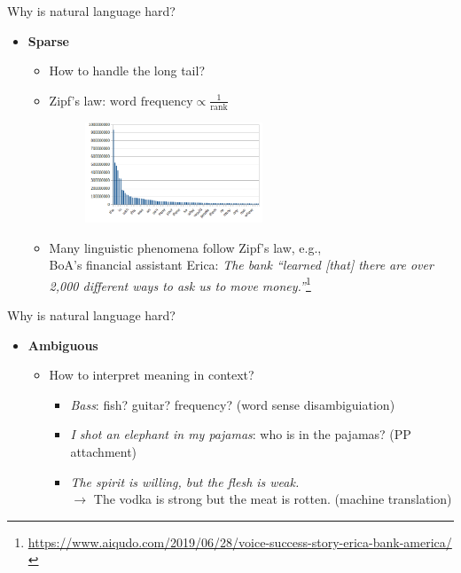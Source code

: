 \documentclass[usenames,dvipsnames,notes,11pt,aspectratio=169]{beamer}
\begin{document}
\begin{frame}
    {Why is natural language hard?}
    \begin{itemize}
        \item \textbf{Sparse} 
            \begin{itemize}
                \item How to handle the long tail?
                \item Zipf's law: $\text{word frequency} \propto \frac{1}{\text{rank}}$
                    \begin{figure}
                        \includegraphics[height=3cm]{figures/zipf}
                    \end{figure}
                \item Many linguistic phenomena follow Zipf's law, e.g.,\\
                    BoA's financial assistant Erica:
                    \textit{The bank ``learned [that] there are over 2,000 different ways to ask us to move money.''}\footnote[frame]{
                        \url{https://www.aiqudo.com/2019/06/28/voice-success-story-erica-bank-america/}
                    }
            \end{itemize}
    \end{itemize}
\end{frame}

\begin{frame}
    {Why is natural language hard?}
    \begin{itemize}
        \item \textbf{Ambiguous} 
            \begin{itemize}
                \item How to interpret meaning in context?
                \medskip
                \begin{itemize}
                    \itemsep2em
                    \item[] {\it Bass}: fish? guitar? frequency? (word sense disambiguiation)
                    \item[] {\it I shot an elephant in my pajamas}: who is in the pajamas? (PP attachment)
                    \item[] {\it The spirit is willing, but the flesh is weak.}\\
                        $\rightarrow$ 
                        The vodka is strong but the meat is rotten. (machine translation)
                \end{itemize}
            \end{itemize}
    \end{itemize}
\end{frame}
\end{document}
